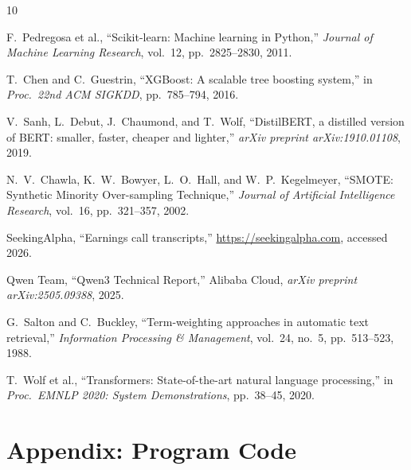 \documentclass[12pt]{article}
\begin{document}

\begin{thebibliography}{10}

F.~Pedregosa et al.,
``Scikit-learn: Machine learning in Python,''
\emph{Journal of Machine Learning Research}, vol.~12, pp.~2825--2830, 2011.

T.~Chen and C.~Guestrin,
``XGBoost: A scalable tree boosting system,''
in \emph{Proc.\ 22nd ACM SIGKDD}, pp.~785--794, 2016.

V.~Sanh, L.~Debut, J.~Chaumond, and T.~Wolf,
``DistilBERT, a distilled version of BERT: smaller, faster, cheaper and lighter,''
\emph{arXiv preprint arXiv:1910.01108}, 2019.

N.~V.~Chawla, K.~W.~Bowyer, L.~O.~Hall, and W.~P.~Kegelmeyer,
``SMOTE: Synthetic Minority Over-sampling Technique,''
\emph{Journal of Artificial Intelligence Research}, vol.~16, pp.~321--357, 2002.

SeekingAlpha,
``Earnings call transcripts,''
\url{https://seekingalpha.com}, accessed 2026.

Qwen Team,
``Qwen3 Technical Report,''
Alibaba Cloud, \emph{arXiv preprint arXiv:2505.09388}, 2025.

G.~Salton and C.~Buckley,
``Term-weighting approaches in automatic text retrieval,''
\emph{Information Processing \& Management}, vol.~24, no.~5, pp.~513--523, 1988.

T.~Wolf et al.,
``Transformers: State-of-the-art natural language processing,''
in \emph{Proc.\ EMNLP 2020: System Demonstrations}, pp.~38--45, 2020.

\end{thebibliography}

\clearpage
\appendix
\section*{Appendix: Program Code}
\end{document}
